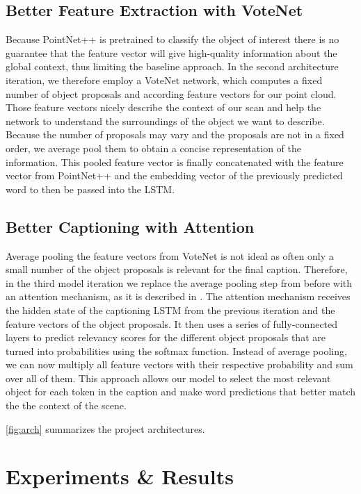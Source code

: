 \documentclass[10pt,twocolumn,letterpaper]{article}
\begin{document}
\subsection{Better Feature Extraction with VoteNet}

Because PointNet++ is pretrained to classify the object of interest there is no guarantee that the feature vector will give high-quality information about the global context, thus limiting the baseline approach. In the second architecture iteration, we therefore employ a VoteNet \cite{qi2019deep} network, which computes a fixed number of object proposals and according feature vectors for our point cloud. Those feature vectors nicely describe the context of our scan and help the network to understand the surroundings of the object we want to describe. Because the number of proposals may vary and the proposals are not in a fixed order, we average pool them to obtain a concise representation of the information. This pooled feature vector is finally concatenated with the feature vector from PointNet++ and the embedding vector of the previously predicted word to then be passed into the LSTM.

\subsection{Better Captioning with Attention}

Average pooling the feature vectors from VoteNet is not ideal as often only a small number of the object proposals is relevant for the final caption. Therefore, in the third model iteration we replace the average pooling step from before with an attention mechanism, as it is described in \cite{xu2015show}. The attention mechanism receives the hidden state of the captioning LSTM from the previous iteration and the feature vectors of the object proposals. It then uses a series of fully-connected layers to predict relevancy scores for the different object proposals that are turned into probabilities using the softmax function. Instead of average pooling, we can now multiply all feature vectors with their respective probability and sum over all of them. This approach allows our model to select the most relevant object for each token in the caption and make word predictions that better match the the context of the scene.

\autoref{fig:arch} summarizes the project architectures.


\section{Experiments \& Results}
\end{document}

